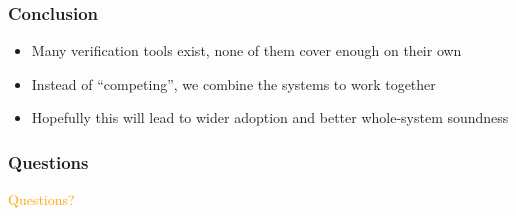 \documentclass[compress,handout]{beamer}
\begin{document}
\begin{frame}
  \frametitle{Conclusion}

  \begin{itemize}
    \item<1-> Many verification tools exist, none of them cover enough on their
              own
    \item<2-> Instead of ``competing'', we combine the systems to work together
    \item<3-> Hopefully this will lead to wider adoption and better whole-system
              soundness
  \end{itemize}

\end{frame}


\begin{frame}
  \frametitle{Questions}

  \begin{center}
    \textcolor<1>{orange}{\Large Questions?}
  \end{center}

\end{frame}

\end{document}
